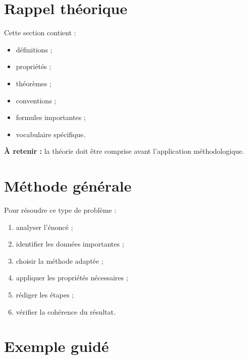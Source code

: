 \documentclass[11pt,a4paper]{article}
\begin{document}
\section{Rappel théorique}

\begin{cadretheorie}
Cette section contient :
\begin{itemize}
    \item définitions ;
    \item propriétés ;
    \item théorèmes ;
    \item conventions ;
    \item formules importantes ;
    \item vocabulaire spécifique.
\end{itemize}

\medskip

\textbf{À retenir :}
la théorie doit être comprise avant l’application méthodologique.
\end{cadretheorie}

\section{Méthode générale}

\begin{cadremethode}
Pour résoudre ce type de problème :

\begin{enumerate}
    \item analyser l’énoncé ;
    \item identifier les données importantes ;
    \item choisir la méthode adaptée ;
    \item appliquer les propriétés nécessaires ;
    \item rédiger les étapes ;
    \item vérifier la cohérence du résultat.
\end{enumerate}
\end{cadremethode}

\section{Exemple guidé}
\end{document}
